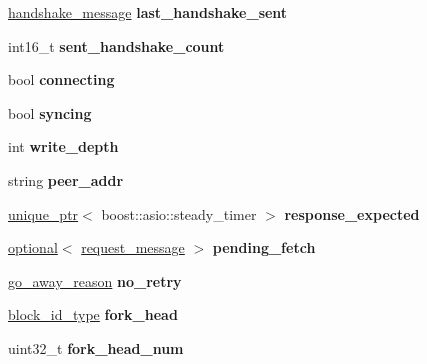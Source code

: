 \begin{DoxyCompactItemize}
\item 
\mbox{\label{classaacio_1_1connection_a52e448e8866881371ea36c817447c5ad}} 
\mbox{\hyperlink{structaacio_1_1handshake__message}{handshake\+\_\+message}} {\bfseries last\+\_\+handshake\+\_\+sent}
\item 
\mbox{\label{classaacio_1_1connection_a9aac358def56f8228a1f63a18e9054a6}} 
int16\+\_\+t {\bfseries sent\+\_\+handshake\+\_\+count}
\item 
\mbox{\label{classaacio_1_1connection_a9649e8b457ee8e49ae9439628910ea31}} 
bool {\bfseries connecting}
\item 
\mbox{\label{classaacio_1_1connection_a8cc68a332dc29a003af9207f030e1d5e}} 
bool {\bfseries syncing}
\item 
\mbox{\label{classaacio_1_1connection_ac37114d9619c5f6be048eaaca56a84ab}} 
int {\bfseries write\+\_\+depth}
\item 
\mbox{\label{classaacio_1_1connection_a6d0b51277cfa28c9cfe9438b25fbfb6a}} 
string {\bfseries peer\+\_\+addr}
\item 
\mbox{\label{classaacio_1_1connection_a56592b7f5b0c16bdeedcdc807ecdfd0a}} 
\mbox{\hyperlink{classfc_1_1unique__ptr}{unique\+\_\+ptr}}$<$ boost\+::asio\+::steady\+\_\+timer $>$ {\bfseries response\+\_\+expected}
\item 
\mbox{\label{classaacio_1_1connection_ae4d3d6c53cba9df21cee9e578a793468}} 
\mbox{\hyperlink{classaacio_1_1optional}{optional}}$<$ \mbox{\hyperlink{structaacio_1_1request__message}{request\+\_\+message}} $>$ {\bfseries pending\+\_\+fetch}
\item 
\mbox{\label{classaacio_1_1connection_a76eef171c510113c1545932768b89dd6}} 
\mbox{\hyperlink{plugins_2net__plugin_2include_2aacio_2net__plugin_2protocol_8hpp_a1b8490273cc36ec0241920722ba18ab4}{go\+\_\+away\+\_\+reason}} {\bfseries no\+\_\+retry}
\item 
\mbox{\label{classaacio_1_1connection_ab7493a8150c46fd6d9356f5781c622ce}} 
\mbox{\hyperlink{classfc_1_1sha256}{block\+\_\+id\+\_\+type}} {\bfseries fork\+\_\+head}
\item 
\mbox{\label{classaacio_1_1connection_a5ee8bfc334ca82b301b7e8c440515b0c}} 
uint32\+\_\+t {\bfseries fork\+\_\+head\+\_\+num}
\end{DoxyCompactItemize}
